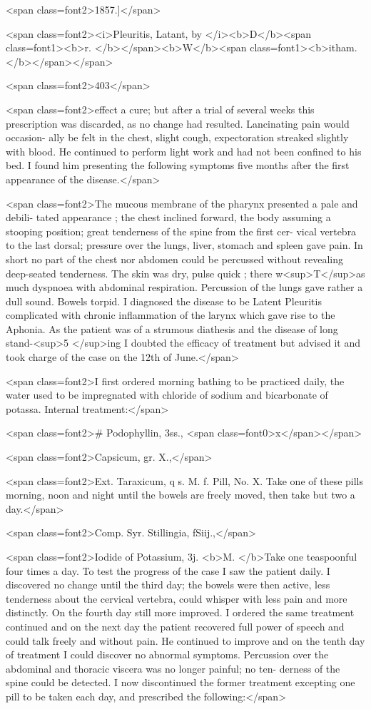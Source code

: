 <span class=font2>1857.]</span>

<span class=font2><i>Pleuritis, Latant, by </i><b>D</b><span class=font1><b>r. </b></span><b>W</b><span class=font1><b>itham.</b></span></span>

<span class=font2>403</span>

<span class=font2>effect a cure; but after a trial of several weeks this prescription was
discarded, as no change had resulted. Lancinating pain would occasion-
ally be felt in the chest, slight cough, expectoration streaked slightly
with blood. He continued to perform light work and had not been
confined to his bed. I found him presenting the following symptoms
five months after the first appearance of the disease.</span>

<span class=font2>The mucous membrane of the pharynx presented a pale and debili-
tated appearance ; the chest inclined forward, the body assuming a
stooping position; great tenderness of the spine from the first cer-
vical vertebra to the last dorsal; pressure over the lungs, liver, stomach
and spleen gave pain. In short no part of the chest nor abdomen
could be percussed without revealing deep-seated tenderness. The
skin was dry, pulse quick ; there w<sup>T</sup>as much dyspnoea with abdominal
respiration. Percussion of the lungs gave rather a dull sound. Bowels
torpid. I diagnosed the disease to be Latent Pleuritis complicated
with chronic inflammation of the larynx which gave rise to the Aphonia.
As the patient was of a strumous diathesis and the disease of long stand-<sup>5
</sup>ing I doubted the efficacy of treatment but advised it and took charge
of the case on the 12th of June.</span>

<span class=font2>I first ordered morning bathing to be practiced daily, the water used
to be impregnated with chloride of sodium and bicarbonate of potassa.
Internal treatment:</span>

<span class=font2>#   Podophyllin, 3ss., <span class=font0>x</span></span>

<span class=font2>Capsicum, gr. X.,</span>

<span class=font2>Ext. Taraxicum, q s.
M. f. Pill, No. X.   Take one of these pills morning, noon and night
until the bowels are freely moved, then take but two a day.</span>

<span class=font2>Comp. Syr. Stillingia, fSiij.,</span>

<span class=font2>Iodide of Potassium, 3j.
<b>M. </b>Take one teaspoonful four times a day. To test the progress of
the case I saw the patient daily. I discovered no change until the third
day; the bowels were then active, less tenderness about the cervical
vertebra, could whisper with less pain and more distinctly. On the
fourth day still more improved. I ordered the same treatment continued
and on the next day the patient recovered full power of speech and could
talk freely and without pain. He continued to improve and on the tenth
day of treatment I could discover no abnormal symptoms. Percussion
over the abdominal and thoracic viscera was no longer painful; no ten-
derness of the spine could be detected. I now discontinued the former
treatment excepting one pill to be taken each day, and prescribed the
following:</span>
